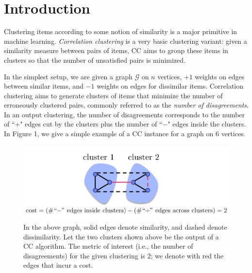 \documentclass{article} %
\begin{document}
\section{Introduction}

%
Clustering items according to some notion of similarity is a major primitive in machine learning.
{\it Correlation clustering} is a very basic clustering variant: given a similarity measure between pairs of items, CC aims to group these items in clusters so that the number of unsatisfied pairs is minimized.

In the simplest setup, we are given a graph $\mathcal{G}$ on $n$ vertices, $+1$ weights on edges between similar items, and $-1$ weights on edges for dissimilar items. 
Correlation clustering aims to generate clusters of items that minimize the number of erroneously clustered pairs, commonly referred to as the {\it number of disagreements}.
In an output clustering, the number of disagreements corresponds to the number of ``$+$" edges cut by the clusters plus the number of ``$-$" edges inside the clusters.
In Figure 1, we give a simple example of a CC instance for a graph on 6 vertices.
 \begin{figure}[h]
\centerline{ \includegraphics[width=1\columnwidth]{images/graph_example.pdf}}
\caption{In the above graph, solid edges denote similarity, and dashed denote dissimilarity.
Let the two clusters shown above be the output of a CC algorithm.
The metric of interest (i.e., the number of disagreements) for the given clustering is $2$; we denote with red the edges that incur a cost.}
\label{fig:graph_example}
\end{figure}     
\end{document}
